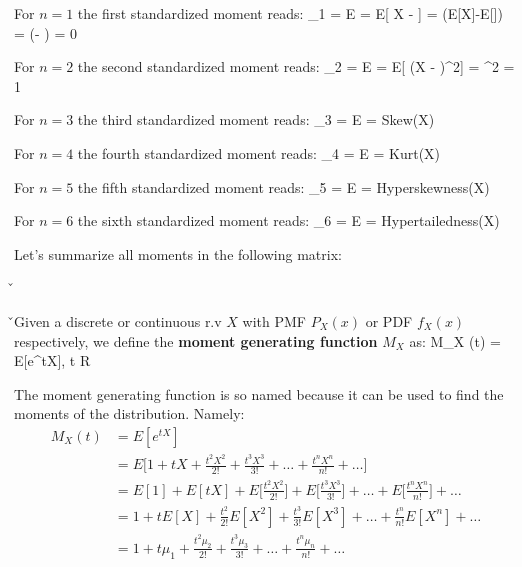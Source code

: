 For $n=1$ the first standardized moment reads:
\bse
\mu_1 = E  =  E[ X - \mu]
=  (E[X]-E[\mu]) =  (\mu - \mu ) = 0
\ese

For $n=2$ the second standardized moment reads:
\bse
\mu_2 = E 
=  E[ (X - \mu)^2] =  \sigma^2 = 1
\ese

For $n=3$ the third standardized moment reads:
\bse
\mu_3 = E  = Skew(X)
\ese

For $n=4$ the fourth standardized moment reads:
\bse
\mu_4 = E  = Kurt(X)
\ese

For $n=5$ the fifth standardized moment reads:
\bse
\mu_5 = E  = Hyperskewness(X)
\ese

For $n=6$ the sixth standardized moment reads:
\bse
\mu_6 = E  = Hypertailedness(X)
\ese

Let's summarize all moments in the following matrix:

\v


\v

Given a discrete or continuous r.v $X$ with PMF $P_{X}(x)$ or PDF $f_{X}(x)$ respectively, we define the
\textbf{moment generating function} $M_{X}$ as:
\bse
M_{X} (t) = E[e^{tX}], \:\:\: t \in R
\ese
\ed

The moment generating function is so named because it can be used to find the moments of the distribution. Namely:
{\setlength{\jot}{10pt}
\begin{align*}
M_{X} (t) &= E[e^{tX}] \\
&= E \Big[ 1 + tX + \frac{t^{2}X^{2}}{2!} + \frac{t^{3}X^{3}}{3!} + \ldots + \frac{t^{n}X^{n}}{n!} +\ldots \Big] \\
&= E[1] + E[tX] + E \Big[ \frac{t^{2}X^{2}}{2!} \Big] + E \Big[\frac{t^{3}X^{3}}{3!} \Big]
+ \ldots + E \Big[\frac{t^{n}X^{n}}{n!} \Big]+ \ldots \\
&= 1 + tE[X] + \frac{t^{2}}{2!} E[X^{2}] + \frac{t^{3}}{3!} E[X^{3}] + \ldots + \frac{t^{n}}{n!} E[X^{n}] + \ldots \\
&= 1 + t \mu_{1} + \frac{t^{2}\mu_{2}}{2!} + \frac{t^{3}\mu_{3}}{3!} + \ldots + \frac{t^{n}\mu_{n}}{n!} + \ldots
\end{align*}}

